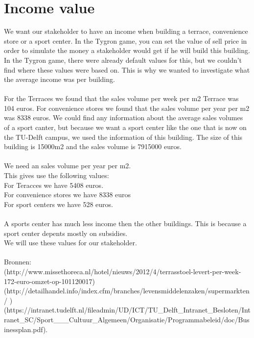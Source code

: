 \documentclass[]{article}
\begin{document}
	
\section{Income value}

We want our stakeholder to have an income when building a terrace, convenience store or a sport center.
In the Tygron game, you can set the value of sell price in order to simulate the money a stakeholder would get if he will build this building.
In the Tygron game, there were already default values for this, but we couldn't find where these values were based on. 
This is why we wanted to investigate what the average income was per building. \\
\\
For the Terraces we found that the sales volume per week per m2 Terrace was 104 euros. 
For convenience stores we found that the sales volume per year per m2 was 8338 euros. 
We could find any information about the average sales volumes of a sport canter, but because we want a sport center like the one that is now on the TU-Delft campus, we used the information of this building. 
The size of this building is 15000m2 and the sales volume is 7915000 euros.\\
\\
We need an sales volume per year per m2.\\
This gives use the following values:\\
For Teracces we have 5408 euros.\\
For convenience stores we have 8338 euros\\
For sport centers we have 528 euros.\\
\\
A sports center has much less income then the other buildings. This is because a sport center depents mostly on subsidies.\\
We will use these values for our stakeholder.
\\
\\
Bronnen:\\
(http://www.missethoreca.nl/hotel/nieuws/2012/4/terrasstoel-levert-per-week-172-euro-omzet-op-101120017)\\
(http://detailhandel.info/index.cfm/branches/levensmiddelenzaken/supermarkten/   )\\
(https://intranet.tudelft.nl/fileadmin/UD/ICT/TU\_Delft\_Intranet\_Besloten/Intranet\_SC/Sport\_\_\_Cultuur\_Algemeen/Organisatie/Programmabeleid/doc/Businessplan.pdf).\\
\end{document}
